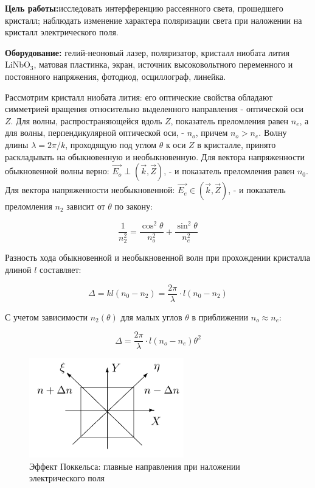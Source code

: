 


  




	\textbf{Цель работы:}исследовать интерференцию рассеянного света, прошедшего кристалл; наблюдать изменение характера поляризации света при наложении на кристалл электрического поля.
	
	\textbf{Оборудование:} гелий-неоновый лазер, поляризатор, кристалл ниобата лития LiNbO$_3$, матовая пластинка, экран, источник высоковольтного переменного и постоянного напряжения, фотодиод, осциллограф, линейка.
	
	Рассмотрим кристалл ниобата лития: его оптические свойства обладают симметрией вращения относительно выделенного направления - оптической оси $Z$. Для волны, распространяющейся вдоль $Z$, показатель преломления равен $n_e$, а для волны, перпендикулярной оптической оси, - $n_o$, причем $n_o > n_e$. Волну длины $\lambda = 2\pi/k$, проходящую под углом $\theta$ к оси $Z$ в кристалле, принято раскладывать на обыкновенную и необыкновенную. Для вектора напряженности обыкновенной волны верно: $\overrightarrow{E_o} \perp (\overrightarrow{k}, \overrightarrow{Z})$, - и показатель преломления равен $n_0$. Для вектора напряженности необыкновенной: $\overrightarrow{E_e} \in (\overrightarrow{k}, \overrightarrow{Z})$, - и показатель преломления $n_2$ зависит от $\theta$ по закону:
	
	\[ \frac{1}{n_2^2} = \frac{\cos^2\theta}{n_o^2} + \frac{\sin^2\theta}{n_e^2} \]
	
	Разность хода обыкновенной и необыкновенной волн при прохождении кристалла длиной $l$ составляет: 
	
	\[ \Delta = kl(n_0 - n_2) = \frac{2\pi}{\lambda} \cdot l (n_0 - n_2) \]
	
	С учетом зависимости $n_2(\theta)$ для малых углов $\theta$ в приближении $n_o \approx n_e$: 
	
	\begin{equation}
		\Delta = \frac{2\pi}{\lambda}\cdot l (n_o - n_e)\theta^2 
	\end{equation}
	
	\begin{figure}[h!]
		\centering
		\includegraphics[width=0.6\textwidth]{pics/maindir}
		\caption{Эффект Поккельса: главные направления при наложении электрического поля}
		\label{dir}
	\end{figure}
	
